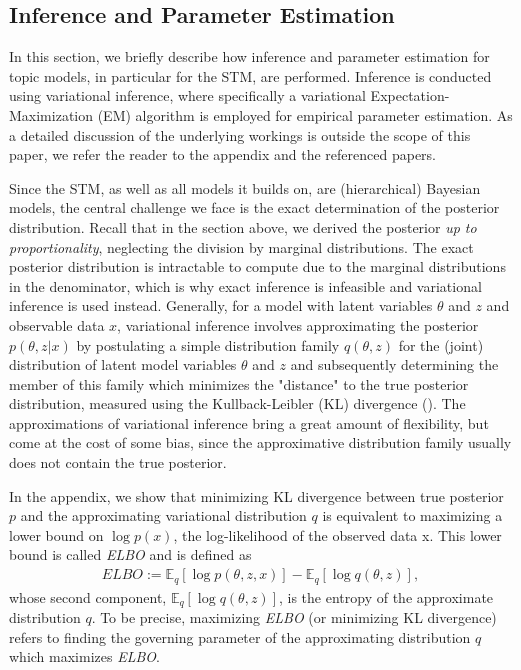 \subsection{Inference and Parameter Estimation}
\label{Inference and Parameter Estimation}

In this section, we briefly describe how inference and parameter estimation for topic models, in particular for the STM, are performed. Inference is conducted using variational inference, where specifically a variational Expectation-Maximization (EM) algorithm is employed for empirical parameter estimation. As a detailed discussion of the underlying workings is outside the scope of this paper, we refer the reader to the appendix and the referenced papers.

Since the STM, as well as all models it builds on, are (hierarchical) Bayesian models, the central challenge we face is the exact determination of the posterior distribution. Recall that in the section above, we derived the posterior \textit{up to proportionality}, neglecting the division by marginal distributions. The exact posterior distribution is intractable to compute due to the marginal distributions in the denominator, which is why exact inference is infeasible and variational inference is used instead. Generally, for a model with latent variables $\theta$ and $z$ and observable data $x$, variational inference involves approximating the posterior $p(\theta,z|x)$ by postulating a simple distribution family $q(\theta,z)$ for the (joint) distribution of latent model variables $\theta$ and $z$ and subsequently determining the member of this family which minimizes the "distance" to the true posterior distribution, measured using the Kullback-Leibler (KL) divergence (\citealp{wang2013variational}). The approximations of variational inference bring a great amount of flexibility, but come at the cost of some bias, since the approximative distribution family usually does not contain the true posterior.

In the appendix, we show that minimizing KL divergence between true posterior $p$ and the approximating variational distribution $q$ is equivalent to maximizing a lower bound on $\log p(x)$, the log-likelihood of the observed data x. This lower bound is called \textit{ELBO} and is defined as
\begin{align*}
ELBO := \mathbb{E}_q[\log p(\theta,z,x)] - \mathbb{E}_q[\log q(\theta,z)],
\end{align*}
whose second component, $\mathbb{E}_q[\log q(\theta,z)]$, is the entropy of the approximate distribution $q$. To be precise, maximizing \textit{ELBO} (or minimizing KL divergence) refers to finding the governing parameter of the approximating distribution $q$ which maximizes \textit{ELBO}.

